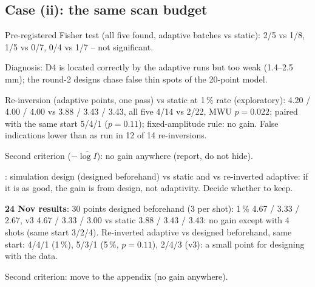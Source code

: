\subsection{Case (ii): the same scan budget}\label{sec:case-ii}
\begin{notes}
\item Pre-registered Fisher test (all five found, adaptive batches vs static): 2/5 vs 1/8, 1/5 vs 0/7, 0/4 vs 1/7 -- not significant.
\item Diagnosis: D4 is located correctly by the adaptive runs but too weak (1.4--2.5\,mm); the round-2 designs chase false thin spots of the 20-point model.
\item Re-inversion (adaptive points, one pass) vs static at 1\,\% rate (exploratory): 4.20 / 4.00 / 4.00 vs 3.88 / 3.43 / 3.43, all five 4/14 vs 2/22, MWU $p=0.022$; paired with the same start 5/4/1 ($p=0.11$); fixed-amplitude rule: no gain. False indications lower than as run in 12 of 14 re-inversions.
\item Second criterion ($-\overline{\log I}$): no gain anywhere (report, do not hide).
\item {}: simulation design (designed beforehand) vs static and vs re-inverted adaptive: if it is as good, the gain is from design, not adaptivity. Decide whether to keep.
\item \textbf{24 Nov results}: 30 points designed beforehand (3 per shot): 1\,\% 4.67 / 3.33 / 2.67, v3 4.67 / 3.33 / 3.00 vs static 3.88 / 3.43 / 3.43: no gain except with 4 shots (same start 3/2/4). Re-inverted adaptive vs designed beforehand, same start: 4/4/1 (1\,\%), 5/3/1 (5\,\%, $p=0.11$), 2/4/3 (v3): a small point for designing with the data.
\item Second criterion: move to the appendix (no gain anywhere).
\end{notes}
